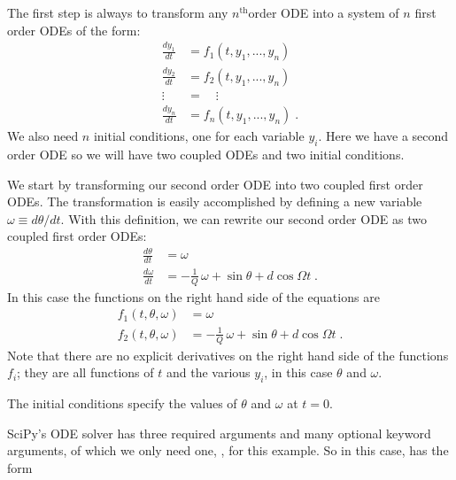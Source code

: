 \documentclass[letterpaper,10pt,english]{sphinxmanual}
\begin{document}
\sphinxAtStartPar
The first step is always to transform any \(n^\mathrm{th}\)\sphinxhyphen{}order ODE into a system of \(n\) first order ODEs of the form:
\begin{equation*}
\begin{split}\frac{dy_1}{dt} &= f_1(t, y_1, ..., y_n) \\
\frac{dy_2}{dt} &= f_2(t, y_1, ..., y_n) \\
    \vdots\quad &= \quad\vdots \\
\frac{dy_n}{dt} &= f_n(t, y_1, ..., y_n) \;.\end{split}
\end{equation*}
\sphinxAtStartPar
We also need \(n\) initial conditions, one for each variable \(y_i\).  Here we have a second order ODE so we will have two coupled ODEs and two initial conditions.

\sphinxAtStartPar
We start by transforming our second order ODE into two coupled first order ODEs.  The transformation is easily accomplished by defining a new variable \(\omega \equiv d\theta/dt\).  With this definition, we can rewrite our second order ODE as two coupled first order ODEs:
\begin{equation*}
\begin{split}\frac{d\theta}{dt} &= \omega \\
\frac{d\omega}{dt} &= -\frac{1}{Q}\,\omega + \sin\theta
                      + d \cos\Omega t \;.\end{split}
\end{equation*}
\sphinxAtStartPar
In this case the functions on the right hand side of the equations are
\begin{equation*}
\begin{split}f_1(t, \theta, \omega) &= \omega \\
f_2(t, \theta, \omega) &= -\frac{1}{Q}\,\omega + \sin\theta
                          + d \cos\Omega t \;.\end{split}
\end{equation*}
\sphinxAtStartPar
Note that there are no explicit derivatives on the right hand side of the functions \(f_i\); they are all functions of \(t\) and the various \(y_i\), in this case \(\theta\) and \(\omega\).

\sphinxAtStartPar
The initial conditions specify the values of \(\theta\) and \(\omega\) at \(t=0\).

\sphinxAtStartPar
SciPy’s ODE solver  has three required arguments and many optional keyword arguments, of which we only need one, , for this example.  So in this case,  has the form
\end{document}
